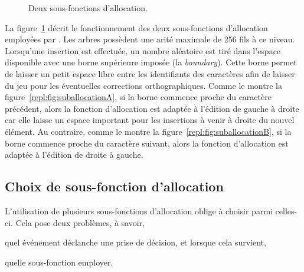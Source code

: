 \begin{figure}
  \begin{center}
    \hspace{20pt}
    \caption[Deux sous-fonctions d'allocation]
    {\label{repl:fig:suballocation}Deux sous-fonctions d'allocation.}
  \end{center}
\end{figure}

La figure~\ref{repl:fig:suballocation} décrit le fonctionnement des deux
sous-fonctions d'allocation employées par \LSEQ. Les arbres possèdent une arité
maximale de 256 fils à ce niveau. Lorsqu'une insertion est effectuée, un nombre
aléatoire est tiré dans l'espace disponible avec une borne supérieure imposée
(la \emph{boundary}). Cette borne permet de laisser un petit espace libre entre
les identifiants des caractères afin de laisser du jeu pour les éventuelles
corrections orthographiques.  Comme le montre la
figure~\ref{repl:fig:suballocationA}, si la borne commence proche du caractère
précédent, alors la fonction d'allocation est adaptée à l'édition de gauche à
droite car elle laisse un espace important pour les insertions à venir à droite
du nouvel élément. Au contraire, comme le montre la
figure~\ref{repl:fig:suballocationB}, si la borne commence proche du caractère
suivant, alors la fonction d'allocation est adaptée à l'édition de droite à
gauche.

\subsection{Choix de sous-fonction d'allocation}
\label{repl:subsec:allocationchoice}

L'utilisation de plusieurs sous-fonctions d'allocation oblige à choisir parmi
celles-ci. Cela pose deux problèmes, à savoir,
\begin{inparaenum}[(i)]
\item quel événement déclanche une prise de décision, et lorsque cela survient, 
\item quelle sous-fonction employer.
\end{inparaenum}

